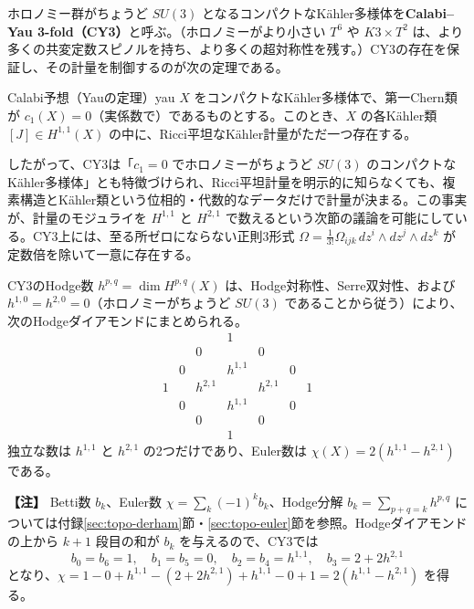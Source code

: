 \documentclass[uplatex, dvipdfmx, book]{jsbook}
\newenvironment{note}{\vspace{1ex}\par\footnotesize\noindent\textbf{【注】}}{\par\vspace{1ex}}
\begin{document}
ホロノミー群がちょうど $SU(3)$ となるコンパクトなK\"ahler多様体を\textbf{Calabi--Yau 3-fold（CY3）}と呼ぶ。（ホロノミーがより小さい $T^6$ や $K3 \times T^2$ は、より多くの共変定数スピノルを持ち、より多くの超対称性を残す。）CY3の存在を保証し、その計量を制御するのが次の定理である\cite{yau1978}。

\begin{mythm}{Calabi予想（Yauの定理）}{yau}
$X$ をコンパクトなK\"ahler多様体で、第一Chern類が $c_1(X) = 0$（実係数で）であるものとする。このとき、$X$ の各K\"ahler類 $[J] \in H^{1,1}(X)$ の中に、Ricci平坦なK\"ahler計量がただ一つ存在する。
\end{mythm}

したがって、CY3は「$c_1 = 0$ でホロノミーがちょうど $SU(3)$ のコンパクトなK\"ahler多様体」とも特徴づけられ、Ricci平坦計量を明示的に知らなくても、複素構造とK\"ahler類という位相的・代数的なデータだけで計量が決まる。この事実が、計量のモジュライを $H^{1,1}$ と $H^{2,1}$ で数えるという次節の議論を可能にしている。CY3上には、至る所ゼロにならない正則3形式 $\Omega = \frac{1}{3!}\Omega_{ijk}\, dz^i \wedge dz^j \wedge dz^k$ が定数倍を除いて一意に存在する。

CY3のHodge数 $h^{p,q} = \dim H^{p,q}(X)$ は、Hodge対称性、Serre双対性、および $h^{1,0} = h^{2,0} = 0$（ホロノミーがちょうど $SU(3)$ であることから従う）により、次のHodgeダイアモンドにまとめられる。
\begin{equation}
\begin{array}{ccccccc}
 & & & 1 & & & \\
 & & 0 & & 0 & & \\
 & 0 & & h^{1,1} & & 0 & \\
 1 & & h^{2,1} & & h^{2,1} & & 1 \\
 & 0 & & h^{1,1} & & 0 & \\
 & & 0 & & 0 & & \\
 & & & 1 & & &
\end{array}
\end{equation}
独立な数は $h^{1,1}$ と $h^{2,1}$ の2つだけであり、Euler数は $\chi(X) = 2(h^{1,1} - h^{2,1})$ である。

\begin{note}
Betti数 $b_k$、Euler数 $\chi = \sum_k (-1)^k b_k$、Hodge分解 $b_k = \sum_{p+q=k} h^{p,q}$ については付録\ref{sec:topo-derham}節・\ref{sec:topo-euler}節を参照。Hodgeダイアモンドの上から $k + 1$ 段目の和が $b_k$ を与えるので、CY3では
\begin{equation*}
    b_0 = b_6 = 1, \quad b_1 = b_5 = 0, \quad b_2 = b_4 = h^{1,1}, \quad b_3 = 2 + 2h^{2,1}
\end{equation*}
となり、$\chi = 1 - 0 + h^{1,1} - (2 + 2h^{2,1}) + h^{1,1} - 0 + 1 = 2(h^{1,1} - h^{2,1})$ を得る。
\end{note}
\end{document}
